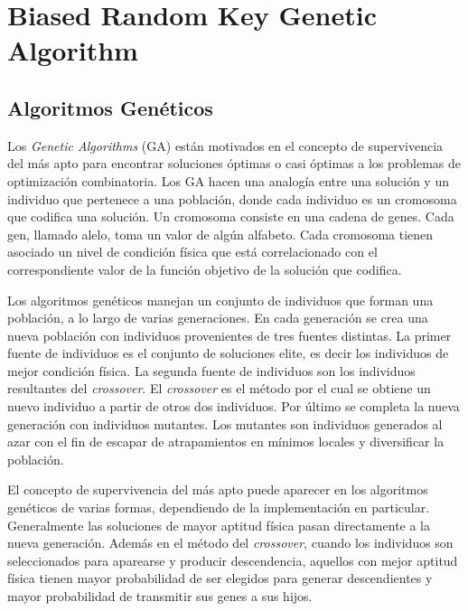 
\chapter{Biased Random Key Genetic Algorithm}

\section{Algoritmos Genéticos}

Los \textit{Genetic Algorithms} (GA) \cite{Goldberg} están motivados en el concepto de supervivencia del más apto para encontrar soluciones óptimas o casi óptimas a los problemas de optimización combinatoria. Los GA hacen una analogía entre una solución y un individuo que pertenece a una población, donde cada individuo es un cromosoma que codifica una solución. Un cromosoma consiste en una cadena de genes. Cada gen, llamado alelo, toma un valor de algún alfabeto. Cada cromosoma tienen asociado un nivel de condición física que está correlacionado con el correspondiente valor de la función objetivo de la solución que codifica. 

\bigskip

Los algoritmos genéticos manejan un conjunto de individuos que forman una población, a lo largo de varias generaciones. En cada generación se crea una nueva población con individuos provenientes de tres fuentes distintas. La primer fuente de individuos es el conjunto de soluciones elite, es decir los individuos de mejor condición física. La segunda fuente de individuos son los individuos resultantes del \textit{crossover}. El \textit{crossover} es el método por el cual se obtiene un nuevo individuo a partir de otros dos individuos. Por último se completa la nueva generación con individuos mutantes. Los mutantes son individuos generados al azar con el fin de escapar de atrapamientos en mínimos locales y diversificar la población. 

\bigskip

El concepto de supervivencia del más apto puede aparecer en los algoritmos genéticos de varias formas, dependiendo de la implementación en particular. Generalmente las soluciones de mayor aptitud física pasan directamente a la nueva generación. Además en el método del \textit{crossover}, cuando los individuos son seleccionados para aparearse y producir descendencia, aquellos con mejor aptitud física tienen mayor probabilidad de ser elegidos para generar descendientes y mayor probabilidad de transmitir sus genes a sus hijos.

